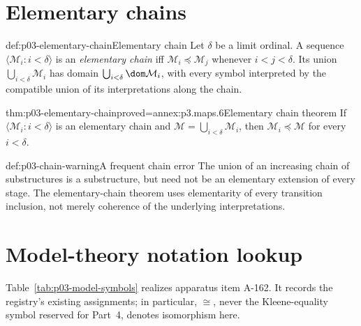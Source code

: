 \section{Elementary chains}
\label{sec:p03-elementary-chains}

\begin{hbdefinition}{def:p03-elementary-chain}{Elementary chain}
Let \(\delta\) be a limit ordinal.  A sequence
\(\langle\mathcal M_i:i<\delta\rangle\) is an \emph{elementary chain} iff
\(\mathcal M_i\preccurlyeq\mathcal M_j\) whenever \(i<j<\delta\).  Its union
\(\bigcup_{i<\delta}\mathcal M_i\) has domain
\(\bigcup_{i<\delta}\dom\mathcal M_i\), with every symbol interpreted by the
compatible union of its interpretations along the chain.
\end{hbdefinition}

\begin{hbtheorem}{thm:p03-elementary-chain}{proved=annex:p3.maps.6}{Elementary chain theorem}
If \(\langle\mathcal M_i:i<\delta\rangle\) is an elementary chain and
\(\mathcal M=\bigcup_{i<\delta}\mathcal M_i\), then
\(\mathcal M_i\preccurlyeq\mathcal M\) for every \(i<\delta\).
\end{hbtheorem}

\begin{hbwarning}{def:p03-chain-warning}{A frequent chain error}
The union of an increasing chain of substructures is a substructure, but need
not be an elementary extension of every stage.  The elementary-chain theorem
uses elementarity of every transition inclusion, not merely coherence of the
underlying interpretations.
\end{hbwarning}

\section{Model-theory notation lookup}
\label{sec:p03-model-symbols}

Table~\ref{tab:p03-model-symbols} realizes apparatus item A-162.  It records
the registry's existing assignments; in particular, \(\cong\), never the
Kleene-equality symbol reserved for Part~4, denotes isomorphism here.

